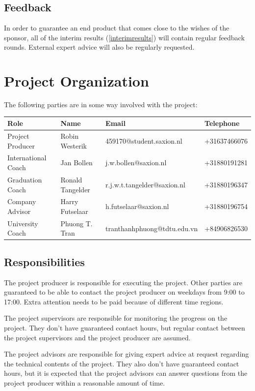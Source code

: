 \documentclass[11pt, a4paper]{article}
\begin{document}
\subsection{Feedback}
In order to guarantee an end product that comes close to the wishes of the sponsor, all of the interim results (\ref{interimresults}) will contain regular feedback rounds. External expert advice will also be regularly requested.
\pagebreak
\section{Project Organization}\label{projectorganization}
The following parties are in some way involved with the project:\\

\begin{tabular}{ | l | l | l | l |}
    \hline
    \textbf{Role} & \textbf{Name} & \textbf{Email} & \textbf{Telephone} \\ \hline
    Project Producer & Robin Westerik & 459170@student.saxion.nl & +31637466076 \\
    International Coach & Jan Bollen & j.w.bollen@saxion.nl & +31880191281\\
    Graduation Coach & Ronald Tangelder & r.j.w.t.tangelder@saxion.nl & +31880196347\\
    Company Advisor & Harry Futselaar & h.futselaar@saxion.nl & +31880196754\\
    University Coach & Phuong T. Tran & tranthanhphuong@tdtu.edu.vn & +84906826530\\
    \hline
\end{tabular}

\subsection{Responsibilities}
The project producer is responsible for executing the project. Other parties are guaranteed to be able to contact the project producer on weekdays from 9:00 to 17:00. Extra attention needs to be paid because of different time regions.

The project supervisors are responsible for monitoring the progress on the project. They don't have guaranteed contact hours, but regular contact between the project supervisors and the project producer are assumed.

The project advisors are responsible for giving expert advice at request regarding the technical contents of the project. They also don't have guaranteed contact hours, but it is expected that the project advisors can answer questions from the project producer within a reasonable amount of time.
\end{document}
